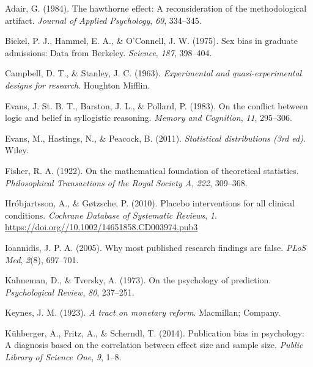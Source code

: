 \documentclass[
  a4paper,
]{book}
\newlength{\cslhangindent}
\newlength{\cslentryspacingunit} %
\newenvironment{CSLReferences}[2] %
 {%
  \setlength{\parindent}{0pt}
  \ifodd #1
  \let\oldpar\par
  \def\par{\hangindent=\cslhangindent\oldpar}
  \fi
  \setlength{\parskip}{#2\cslentryspacingunit}
 }%
 {}
\begin{document}
\hypertarget{refs}{}
\begin{CSLReferences}{1}{0}
\leavevmode{}%
Adair, G. (1984). The hawthorne effect: A reconsideration of the
methodological artifact. \emph{Journal of Applied Psychology},
\emph{69}, 334--345.

\leavevmode{}%
Bickel, P. J., Hammel, E. A., \& O'Connell, J. W. (1975). Sex bias in
graduate admissions: Data from {B}erkeley. \emph{Science}, \emph{187},
398--404.

\leavevmode{}%
Campbell, D. T., \& Stanley, J. C. (1963). \emph{Experimental and
quasi-experimental designs for research}. Houghton Mifflin.

\leavevmode{}%
Evans, J. St. B. T., Barston, J. L., \& Pollard, P. (1983). On the
conflict between logic and belief in syllogistic reasoning. \emph{Memory
and Cognition}, \emph{11}, 295--306.

\leavevmode{}%
Evans, M., Hastings, N., \& Peacock, B. (2011). \emph{Statistical
distributions (3rd ed)}. Wiley.

\leavevmode{}%
Fisher, R. A. (1922). On the mathematical foundation of theoretical
statistics. \emph{Philosophical Transactions of the Royal Society A},
\emph{222}, 309--368.

\leavevmode{}%
Hróbjartsson, A., \& Gøtzsche, P. (2010). Placebo interventions for all
clinical conditions. \emph{Cochrane Database of Systematic Reviews},
\emph{1}. \url{https://doi.org//10.1002/14651858.CD003974.pub3}

\leavevmode{}%
Ioannidis, J. P. A. (2005). Why most published research findings are
false. \emph{PLoS Med}, \emph{2}(8), 697--701.

\leavevmode{}%
Kahneman, D., \& Tversky, A. (1973). On the psychology of prediction.
\emph{Psychological Review}, \emph{80}, 237--251.

\leavevmode{}%
Keynes, J. M. (1923). \emph{A tract on monetary reform}. Macmillan;
Company.

\leavevmode{}%
Kühberger, A., Fritz, A., \& Scherndl, T. (2014). Publication bias in
psychology: A diagnosis based on the correlation between effect size and
sample size. \emph{Public Library of Science One}, \emph{9}, 1--8.


\end{CSLReferences}
\end{document}
